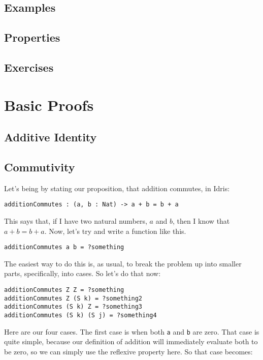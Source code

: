 \documentclass{article}
\newcommand{\inline}[1]{\texttt{#1}}
\begin{document}
\subsection{Examples}

\subsection{Properties}

\subsection{Exercises}

\section{Basic Proofs}
\subsection{Additive Identity}

\subsection{Commutivity}
Let's being by stating our proposition, that addition commutes, in Idris:

\begin{verbatim}
additionCommutes : (a, b : Nat) -> a + b = b + a
\end{verbatim}

This says that, if I have two natural numbers, $a$ and $b$, then I know that $a + b = b + a$.
Now, let’s try and write a function like this.

\begin{verbatim}
additionCommutes a b = ?something
\end{verbatim}

The easiest way to do this is, as usual, to break the problem up into smaller parts, specifically, into cases. So let’s do that now:

\begin{verbatim}
additionCommutes Z Z = ?something
additionCommutes Z (S k) = ?something2
additionCommutes (S k) Z = ?something3
additionCommutes (S k) (S j) = ?something4
\end{verbatim}

Here are our four cases.
The first case is when both \inline{a} and \inline{b} are zero.
That case is quite simple, because our definition of addition will immediately evaluate both to be zero, so we can simply use the reflexive property here.
So that case becomes:
\end{document}
